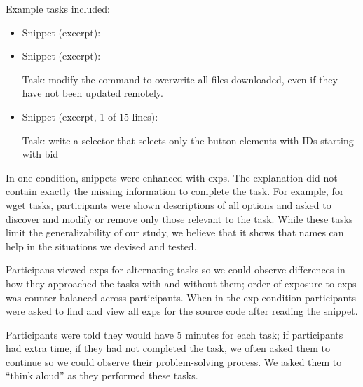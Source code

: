 Example tasks included:
\begin{itemize}

\item
Snippet (excerpt):

\item
Snippet (excerpt):


Task: modify the command to overwrite all files downloaded, even if they have not been updated remotely.

\item

Snippet (excerpt, 1 of 15 lines):


Task: write a selector that selects only the button elements with IDs starting with bid

\end{itemize}
\fi
%
\begin{changes}
In one condition, snippets were enhanced with \glspl{exp}.
The explanation did not contain exactly the missing information to complete the task.
For example, for wget tasks, participants were shown descriptions of all options and asked to discover and modify or remove only those relevant to the task.
While these tasks limit the generalizability of our study, we believe that it shows that \glspl{name} can help in the situations we devised and tested.

Participans viewed \glspl{exp} for alternating tasks so we could observe differences in how they approached the tasks with and without them; order of exposure to \glspl{exp} was counter-balanced across participants. 
When in the \gls{exp} condition participants were asked to find and view all \glspl{exp} for the source code after reading the snippet.

Participants were told they would have 5 minutes for each task; if participants had extra time, if  they had not completed the task, we often asked them to continue so we could observe their problem-solving process.
We asked them to ``think aloud'' as they performed these tasks.

\end{changes}

